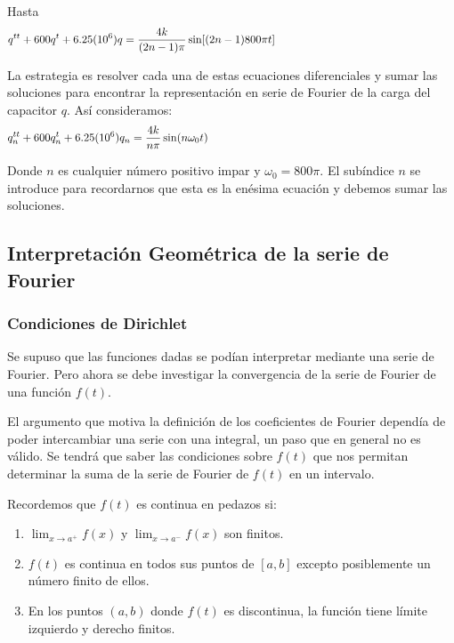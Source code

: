 \documentclass[a4paper]{article}
\begin{document}
{} Hasta  
\[
q^{tt}+600q^{t}+6.25(10^{6})q=\frac{4k}{(2n-1)\pi}\sin[(2n-1)800\pi t] 
\hspace{5.7cm}
\]

{} La estrategia es resolver cada una de estas ecuaciones diferenciales y
sumar las soluciones para encontrar la representaci\'on en serie de Fourier
de la carga del capacitor $q$. As\'i consideramos:  
\[
q_{n}^{tt}+600q_{n}^{t}+6.25(10^{6})q_{n}=\frac{4k}{n\pi}\sin(n\omega_{0} t) 
\hspace{7.8cm}
\]

{} Donde $n$ es cualquier n\'umero positivo impar y $\omega_{0}=800\pi$. El
sub\'indice $n$ se introduce para recordarnos que esta es la en\'esima
ecuaci\'on y debemos sumar las soluciones.


\subsection{Interpretaci\'on Geom\'etrica de la serie de Fourier}

\subsubsection{Condiciones de Dirichlet}

{} Se supuso que las funciones dadas se pod\'ian interpretar mediante una
serie de Fourier. Pero ahora se debe investigar la convergencia de la serie
de Fourier de una funci\'on $f(t)$. 

{} El argumento que motiva la definici\'on de los coeficientes de Fourier
depend\'ia de poder intercambiar una serie con una integral, un paso que en
general no es v\'alido. Se tendr\'a que saber las condiciones sobre $f(t)$
que nos permitan determinar la suma de la serie de Fourier de $f(t)$ en un
intervalo. \newline

{} Recordemos que $f(t)$ es continua en pedazos si: 

\begin{enumerate}
\item $\lim_{x\to a^{+}}f(x)$ y $\lim_{x\to a^{-}}f(x)$ son finitos. 

\item $f(t)$ es continua en todos sus puntos de $[a,b]$ excepto posiblemente
un n\'umero finito de ellos. 

\item En los puntos $(a,b)$ donde $f(t)$ es discontinua, la funci\'on tiene
l\'imite izquierdo y derecho finitos. 
\end{enumerate}
\end{document}
